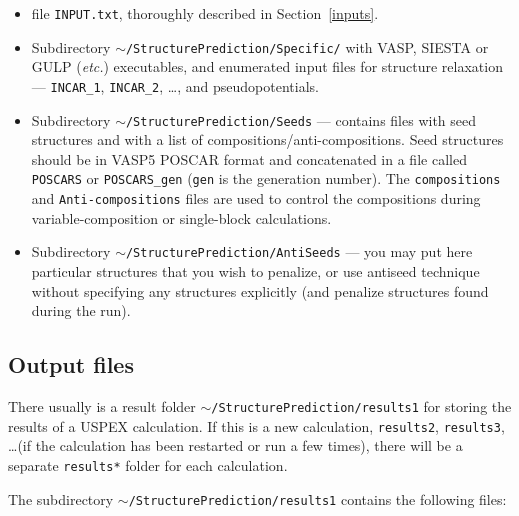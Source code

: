 \documentclass[12pt]{article}
\newcommand{\file}[1]{\texttt{#1}}
\begin{document}
\begin{itemize}

\item file \file{INPUT.txt}, thoroughly described in Section~\ref{inputs}.

\item Subdirectory \file{$\sim$/StructurePrediction/Specific/} with VASP,
SIESTA or GULP (\emph{etc.}) executables, and enumerated input files for
structure relaxation --- \file{INCAR\_1}, \file{INCAR\_2}, \ldots, and
pseudopotentials.

\item Subdirectory \file{$\sim$/StructurePrediction/Seeds} --- contains files
with seed structures and with a list of compositions/anti-compositions. Seed
structures should be in VASP5 POSCAR format and concatenated in a file called
\file{POSCARS} or \file{POSCARS\_gen} (\texttt{gen} is the generation number).
The \file{compositions} and \file{Anti-compositions} files are used to control
the compositions during variable-composition or single-block calculations.

\item Subdirectory \file{$\sim$/StructurePrediction/AntiSeeds} --- you may put
here particular structures that you wish to penalize, or use antiseed technique
without specifying any structures explicitly (and penalize structures found
during the run).

\end{itemize}

\subsection{Output files}
There usually is a result folder  \file{$\sim$/StructurePrediction/results1} for
storing the results of a USPEX calculation. If this is a new calculation,
\file{results2}, \file{results3}, \ldots (if the calculation has been restarted
or run a few times), there will be a separate \file{results*} folder for each
calculation.

The subdirectory \file{$\sim$/StructurePrediction/results1} contains the
following files:
\end{document}
